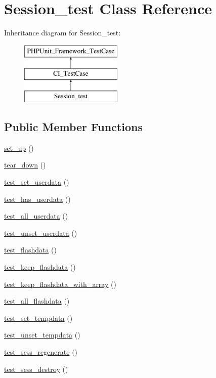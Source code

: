 \hypertarget{class_session__test}{}\section{Session\+\_\+test Class Reference}
\label{class_session__test}
Inheritance diagram for Session\+\_\+test\+:\begin{figure}[H]
\begin{center}
\leavevmode
\includegraphics[height=3.000000cm]{class_session__test}
\end{center}
\end{figure}
\subsection*{Public Member Functions}
\begin{DoxyCompactItemize}
\item 
\hyperlink{class_session__test_a69829875c8d4b6ce94908445c4155741}{set\+\_\+up} ()
\item 
\hyperlink{class_session__test_a32e79c4c257a221990907f9fdc81d64e}{tear\+\_\+down} ()
\item 
\hyperlink{class_session__test_ac899d5daa13e9cb48cfa17587e00447e}{test\+\_\+set\+\_\+userdata} ()
\item 
\hyperlink{class_session__test_a388e50f1effca0a1ce8c29a20e058904}{test\+\_\+has\+\_\+userdata} ()
\item 
\hyperlink{class_session__test_a479280edfe673f722621cd09ce04982f}{test\+\_\+all\+\_\+userdata} ()
\item 
\hyperlink{class_session__test_afd3ed529cc3128eff352811e82ce7b6a}{test\+\_\+unset\+\_\+userdata} ()
\item 
\hyperlink{class_session__test_a79abb682fa0d155d7ee42ea70e603bfd}{test\+\_\+flashdata} ()
\item 
\hyperlink{class_session__test_a5a0ea0f122d2db3daf0739e3fba562dd}{test\+\_\+keep\+\_\+flashdata} ()
\item 
\hyperlink{class_session__test_afaaf18af5e5a91bfbdb3de4a0ecad3bd}{test\+\_\+keep\+\_\+flashdata\+\_\+with\+\_\+array} ()
\item 
\hyperlink{class_session__test_a1a99a8754d7b03d982a3574198ec4e98}{test\+\_\+all\+\_\+flashdata} ()
\item 
\hyperlink{class_session__test_ae4f715d2e69a390829f5603d9bf2b15e}{test\+\_\+set\+\_\+tempdata} ()
\item 
\hyperlink{class_session__test_a7a1945a8e3c0256ce19304eabf951ff9}{test\+\_\+unset\+\_\+tempdata} ()
\item 
\hyperlink{class_session__test_a6e227546045c105601189ec0b14f6ce4}{test\+\_\+sess\+\_\+regenerate} ()
\item 
\hyperlink{class_session__test_abcd75918435989367e37fc4c5380c17b}{test\+\_\+sess\+\_\+destroy} ()
\end{DoxyCompactItemize}
